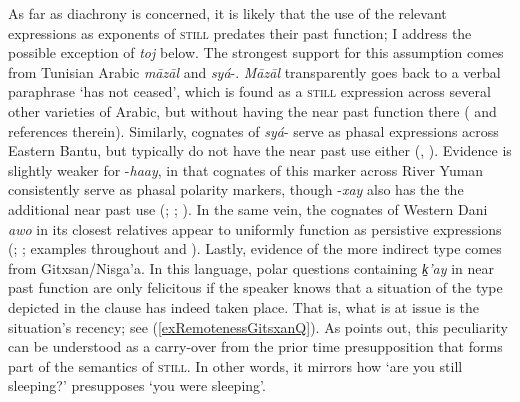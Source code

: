 As far as diachrony is concerned, it is likely that the use of the relevant expressions as exponents of \textsc{still} predates their past function; I address the possible exception of  \textit{toj} below. The strongest support for this assumption comes from Tunisian Arabic \textit{māzāl} and  \mbox{\textit{syá}-}. \textit{Māzāl} transparently goes back to a verbal paraphrase \lq has not ceased', which is found as a \textsc{still} expression across several other varieties of Arabic, but without having the near past function there (\cite{FischerEtAlTunisian} and references therein). Similarly, cognates of  \mbox{\textit{syá}-} serve as phasal expressions across Eastern Bantu, but typically do not have the near past use either (\cite{Abe2015}, \citeyear{Abe2016}). Evidence is slightly weaker for  \mbox{-\textit{haay}}, in that cognates of this marker across River Yuman consistently serve as phasal polarity markers, though  \mbox{-\textit{xay}} also has the the additional near past use (\cite[284]{Halpern1946}; \cite[64]{Munro1974}; \cite[312]{MunroEtAl1992}). In the same vein, the cognates of Western Dani \textit{awo} in its closest relatives appear to uniformly function as persistive expressions (\cite[60]{Burung2007}; \cite[195]{ZoellnerRiesberg2017}; examples throughout \cite{Burung2017} and \cite{Fahner1979}). Lastly, evidence of the more indirect type comes from Gitxsan/Nisga'a. In this language, polar questions containing \textit{k̠’ay} in near past function are only felicitous if the speaker knows that a situation of the type depicted in the clause has indeed taken place. That is, what is at issue is the situation's recency; see (\ref{exRemotenessGitsxanQ}). As \textcite{Aonuki2021} points out, this peculiarity can be understood as a carry-over from the prior time presupposition that forms part of the semantics of \textsc{still}. In other words, it mirrors how \lq are you still sleeping?' presupposes \lq you were sleeping'. 

\begin{exe}
\end{exe}

